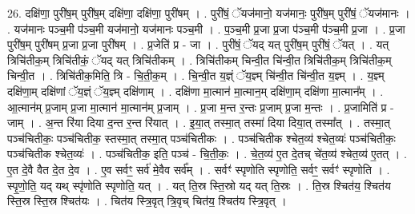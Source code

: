 \documentclass[17pt]{extarticle}
\begin{document}
26. दक्षि॑णा॒ पुरी॑ष॒म् पुरी॑ष॒म् दक्षि॑णा॒ दक्षि॑णा॒ पुरी॑षम् । . पुरी॑षं॒ ॅयज॑मानो॒ यज॑मानः॒ पुरी॑ष॒म् पुरी॑षं॒ ॅयज॑मानः । . यज॑मानः पञ्च॒मी प॑ञ्च॒मी यज॑मानो॒ यज॑मानः पञ्च॒मी । . प॒ञ्च॒मी प्र॒जा प्र॒जा प॑ञ्च॒मी प॑ञ्च॒मी प्र॒जा । . प्र॒जा पुरी॑ष॒म् पुरी॑षम् प्र॒जा प्र॒जा पुरी॑षम् । . प्र॒जेति॑ प्र - जा । . पुरी॑षं॒ ॅयद् यत् पुरी॑ष॒म् पुरी॑षं॒ ॅयत् । . यत् त्रिचि॑तीक॒म् त्रिचि॑तीकं॒ ॅयद् यत् त्रिचि॑तीकम् । . त्रिचि॑तीकम् चिन्वी॒त चि॑न्वी॒त त्रिचि॑तीक॒म् त्रिचि॑तीक॒म् चिन्वी॒त । . त्रिचि॑तीक॒मिति॒ त्रि - चि॒ती॒क॒म् । . चि॒न्वी॒त य॒ज्ञ्ं ॅय॒ज्ञ्म् चि॑न्वी॒त चि॑न्वी॒त य॒ज्ञ्म् । . य॒ज्ञ्म् दक्षि॑णा॒म् दक्षि॑णां ॅय॒ज्ञ्ं ॅय॒ज्ञ्म् दक्षि॑णाम् । . दक्षि॑णा मा॒त्मान॑ मा॒त्मान॒म् दक्षि॑णा॒म् दक्षि॑णा मा॒त्मान᳚म् । . आ॒त्मान॑म् प्र॒जाम् प्र॒जा मा॒त्मान॑ मा॒त्मान॑म् प्र॒जाम् । . प्र॒जा म॒न्त र॒न्तः प्र॒जाम् प्र॒जा म॒न्तः । . प्र॒जामिति॑ प्र - जाम् । . अ॒न्त रि॑या दिया द॒न्त र॒न्त रि॑यात् । . इ॒या॒त् तस्मा॒त् तस्मा॑ दिया दिया॒त् तस्मा᳚त् । . तस्मा॒त् पञ्च॑चितीकः॒ पञ्च॑चितीक॒ स्तस्मा॒त् तस्मा॒त् पञ्च॑चितीकः । . पञ्च॑चितीक श्चेत॒व्य॑ श्चेत॒व्यः॑ पञ्च॑चितीकः॒ पञ्च॑चितीक श्चेत॒व्यः॑ । . पञ्च॑चितीक॒ इति॒ पञ्च॑ - चि॒ती॒कः॒ । . चे॒त॒व्य॑ ए॒त दे॒तच् चे॑त॒व्य॑ श्चेत॒व्य॑ ए॒तत् । . ए॒त दे॒वै वैत दे॒त दे॒व । . ए॒व सर्वꣳ॒॒ सर्व॑ मे॒वैव सर्व᳚म् । . सर्वꣳ॑ स्पृणोति स्पृणोति॒ सर्वꣳ॒॒ सर्वꣳ॑ स्पृणोति । . स्पृ॒णो॒ति॒ यद् यथ् स्पृ॑णोति स्पृणोति॒ यत् । . यत् ति॒स्र स्ति॒स्रो यद् यत् ति॒स्रः । . ति॒स्र श्चित॑य॒ श्चित॑य स्ति॒स्र स्ति॒स्र श्चित॑यः । . चित॑य स्त्रि॒वृत् त्रि॒वृच् चित॑य॒ श्चित॑य स्त्रि॒वृत् । \newline
\end{document}
